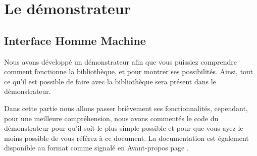 \documentclass[12pt,a4paper,oneside]{book}
\begin{document}
	\maketitle
	\setcounter{tocdepth}{1}
	\setcounter{secnumdepth}{3}
	\frontmatter
	
	\tableofcontents
	\nouveauChapitre
	\newpage
	\mainmatter
	\chapter{Le démonstrateur}
	\section{Interface Homme Machine}
	\nouveauChapitre
	Nous avons développé un démonstrateur afin que vous puissiez comprendre comment fonctionne la bibliothèque, et pour montrer ses possibilités.
	Ainsi, tout ce qu'il est possible de faire avec la bibliothèque sera présent dans le démonstrateur.

	Dans cette partie nous allons passer brièvement ses fonctionnalités, cependant, pour une meilleure
	compréhension, nous avons commentés le code du démonstrateur pour qu'il soit le plus simple possible et pour que vous ayez le moins 
	possible de vous référez à ce document. La documentation est également disponible au format  comme signalé en Avant-propos page \pageref{docDemonstrateur}.
\end{document}
